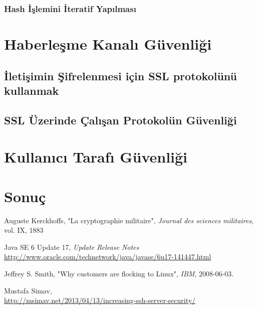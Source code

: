 \documentclass[11pt]{report}
\begin{document}
\subsection{Hash İşlemini İteratif Yapılması}

\chapter{Haberleşme Kanalı Güvenliği}
\section{İletişimin Şifrelenmesi için SSL protokolünü kullanmak}
\section{SSL Üzerinde Çalışan Protokolün Güvenliği}


\chapter{Kullanıcı Tarafı Güvenliği}

\chapter{Sonuç}


\begin{thebibliography}{9}

  Auguste Kerckhoffs,
  "La cryptographie militaire",
  \emph{Journal des sciences militaires},
  vol. IX,
  1883

  Java SE 6 Update 17, \emph{Update Release Notes} \\
  \url{http://www.oracle.com/technetwork/java/javase/6u17-141447.html}

  Jeffrey S. Smith,
  "Why customers are flocking to Linux",
  \emph{IBM},
  2008-06-03.

  Mustafa Simav, \\
  \url{http://msimav.net/2013/04/13/increasing-ssh-server-security/}

\end{thebibliography}
\end{document}
